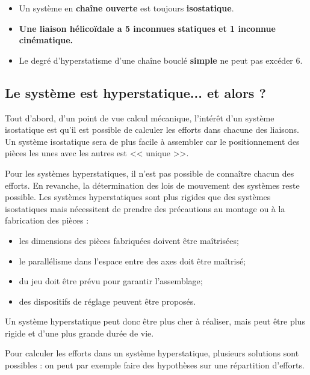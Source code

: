 \begin{remarque}[s]

\begin{itemize}
\item Un système en \textbf{chaîne ouverte} est toujours \textbf{isostatique}.%
\item \textbf{Une liaison hélicoïdale a 5 inconnues statiques et 1 inconnue cinématique.}
\item Le degré d'hyperstatisme d'une chaîne bouclé \textbf{simple} ne peut pas excéder 6.
\end{itemize}
\end{remarque}


\subsection{Le système est hyperstatique... et alors ?}

Tout d'abord, d'un point de vue calcul mécanique, l'intérêt d'un système isostatique est qu'il est possible de calculer les efforts dans chacune des liaisons. Un système isostatique sera de plus facile à assembler car le positionnement des pièces les unes avec les autres est << unique >>. 

Pour les systèmes hyperstatiques, il n'est pas possible de connaître chacun des efforts. En revanche, la détermination des lois de mouvement des systèmes reste possible. Les systèmes hyperstatiques sont plus rigides que des systèmes isostatiques mais nécessitent de prendre des précautions au montage ou à la fabrication des pièces : 
\begin{itemize}
 \item les dimensions des pièces fabriquées doivent être maîtrisées;
 \item le parallélisme dans l'espace entre des axes doit être maîtrisé;
 \item du jeu doit être prévu pour garantir l'assemblage;
 \item des dispositifs de réglage peuvent être proposés.
\end{itemize}

Un système hyperstatique peut donc être plus cher à réaliser, mais peut être plus rigide et d'une plus grande durée de vie. 

Pour calculer les efforts dans un système hyperstatique, plusieurs solutions sont possibles : on peut par exemple faire des hypothèses sur une répartition d'efforts. 


